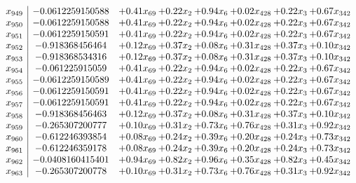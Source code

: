 \documentclass[8pt]{article}
\begin{document}
\[\begin{array}{c| c c@{\hskip 2pt} c@{\hskip 2pt} c@{\hskip 2pt} c@{\hskip 2pt} c@{\hskip 2pt} c@{\hskip 2pt} }
 x_{949}   &  -0.0612259150588 & +  0.41 x_{69} & +  0.22 x_{2} & +  0.94 x_{6} & +  0.02 x_{428} & +  0.22 x_{3} & +  0.67 x_{342}\\
 x_{950}   &  -0.0612259150588 & +  0.41 x_{69} & +  0.22 x_{2} & +  0.94 x_{6} & +  0.02 x_{428} & +  0.22 x_{3} & +  0.67 x_{342}\\
 x_{951}   &  -0.0612259150591 & +  0.41 x_{69} & +  0.22 x_{2} & +  0.94 x_{6} & +  0.02 x_{428} & +  0.22 x_{3} & +  0.67 x_{342}\\
 x_{952}   &  -0.918368456464 & +  0.12 x_{69} & +  0.37 x_{2} & +  0.08 x_{6} & +  0.31 x_{428} & +  0.37 x_{3} & +  0.10 x_{342}\\
 x_{953}   &  -0.918368534316 & +  0.12 x_{69} & +  0.37 x_{2} & +  0.08 x_{6} & +  0.31 x_{428} & +  0.37 x_{3} & +  0.10 x_{342}\\
 x_{954}   &  -0.061225915059 & +  0.41 x_{69} & +  0.22 x_{2} & +  0.94 x_{6} & +  0.02 x_{428} & +  0.22 x_{3} & +  0.67 x_{342}\\
 x_{955}   &  -0.0612259150589 & +  0.41 x_{69} & +  0.22 x_{2} & +  0.94 x_{6} & +  0.02 x_{428} & +  0.22 x_{3} & +  0.67 x_{342}\\
 x_{956}   &  -0.0612259150591 & +  0.41 x_{69} & +  0.22 x_{2} & +  0.94 x_{6} & +  0.02 x_{428} & +  0.22 x_{3} & +  0.67 x_{342}\\
 x_{957}   &  -0.0612259150591 & +  0.41 x_{69} & +  0.22 x_{2} & +  0.94 x_{6} & +  0.02 x_{428} & +  0.22 x_{3} & +  0.67 x_{342}\\
 x_{958}   &  -0.918368456463 & +  0.12 x_{69} & +  0.37 x_{2} & +  0.08 x_{6} & +  0.31 x_{428} & +  0.37 x_{3} & +  0.10 x_{342}\\
 x_{959}   &  -0.265307200777 & +  0.10 x_{69} & +  0.31 x_{2} & +  0.73 x_{6} & +  0.76 x_{428} & +  0.31 x_{3} & +  0.92 x_{342}\\
 x_{960}   &  -0.612246393854 & +  0.08 x_{69} & +  0.24 x_{2} & +  0.39 x_{6} & +  0.20 x_{428} & +  0.24 x_{3} & +  0.73 x_{342}\\
 x_{961}   &  -0.612246359178 & +  0.08 x_{69} & +  0.24 x_{2} & +  0.39 x_{6} & +  0.20 x_{428} & +  0.24 x_{3} & +  0.73 x_{342}\\
 x_{962}   &  -0.0408160415401 & +  0.94 x_{69} & +  0.82 x_{2} & +  0.96 x_{6} & +  0.35 x_{428} & +  0.82 x_{3} & +  0.45 x_{342}\\
 x_{963}   &  -0.265307200778 & +  0.10 x_{69} & +  0.31 x_{2} & +  0.73 x_{6} & +  0.76 x_{428} & +  0.31 x_{3} & +  0.92 x_{342}\\

\end{array}\]
\end{document}
